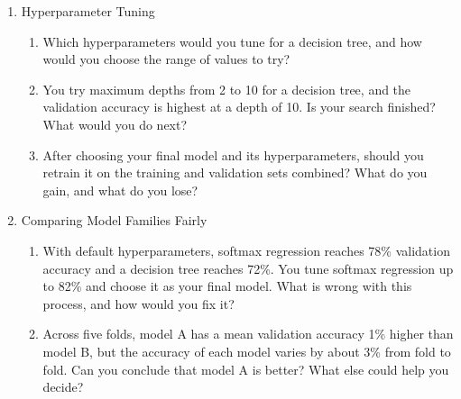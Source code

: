 \documentclass[12pt]{article}
\begin{document}
\begin{enumerate}
\begin{enumerate}
\item What is cross validation? If we want to use cross validation, why should we use
  grouped cross validation, grouped by the unique ID?

\item Pre-processing steps such as normalization and text vectorization learn values
  from the data, like a mean or a vocabulary. Which part of the data should these values
  be computed from during cross validation, and why?

\end{enumerate}

\item Hyperparameter Tuning

\begin{enumerate}

\item Which hyperparameters would you tune for a decision tree, and how would you choose
  the range of values to try?

\item You try maximum depths from 2 to 10 for a decision tree, and the validation
  accuracy is highest at a depth of 10. Is your search finished? What would you do next?

\item After choosing your final model and its hyperparameters, should you retrain it on
  the training and validation sets combined? What do you gain, and what do you lose?

\end{enumerate}

\item Comparing Model Families Fairly

\begin{enumerate}

\item With default hyperparameters, softmax regression reaches 78\% validation accuracy
  and a decision tree reaches 72\%. You tune softmax regression up to 82\% and choose it
  as your final model. What is wrong with this process, and how would you fix it?

\item Across five folds, model A has a mean validation accuracy 1\% higher than model B,
  but the accuracy of each model varies by about 3\% from fold to fold. Can you conclude
  that model A is better? What else could help you decide?

\end{enumerate}


\end{enumerate}
\end{document}
